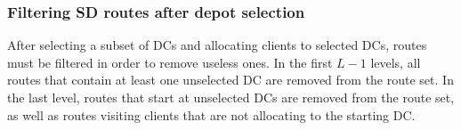 \documentclass[a4paper,10pt]{article}
\begin{document}
\begin{linenumbers}
\newpage

\subsubsection{Filtering SD routes after depot selection}

After selecting a subset of DCs and allocating clients to selected DCs, routes must be filtered in order to remove useless ones. 
In the first $L-1$ levels, all routes that contain at least one unselected DC are removed from the route set. 
In the last level, routes that start at unselected DCs are removed from the route set, as well as routes visiting clients that are not allocating to the starting DC. 


%
%		
%		
%
%
%
%
%		
%				




\end{linenumbers}
\end{document}
